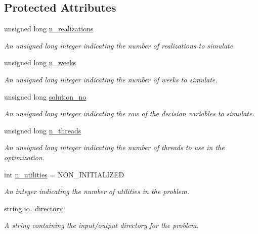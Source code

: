 \subsection*{Protected Attributes}
\begin{DoxyCompactItemize}
\item 
unsigned long \mbox{\hyperlink{classProblem_a270a5672643bfe09e52e0f24e1884136}{n\+\_\+realizations}}
\begin{DoxyCompactList}\small\item\em An unsigned long integer indicating the number of realizations to simulate. \end{DoxyCompactList}\item 
unsigned long \mbox{\hyperlink{classProblem_ac7513bb0ecdfa4bbb7d2ada3595d71ec}{n\+\_\+weeks}}
\begin{DoxyCompactList}\small\item\em An unsigned long integer indicating the number of weeks to simulate. \end{DoxyCompactList}\item 
unsigned long \mbox{\hyperlink{classProblem_a7ca15cdcbff926ddca25bdee5984ffe5}{solution\+\_\+no}}
\begin{DoxyCompactList}\small\item\em An unsigned long integer indicating the row of the decision variables to simulate. \end{DoxyCompactList}\item 
unsigned long \mbox{\hyperlink{classProblem_a3303a162d648e8ae16153b57b5b4054f}{n\+\_\+threads}}
\begin{DoxyCompactList}\small\item\em An unsigned long integer indicating the number of threads to use in the optimization. \end{DoxyCompactList}\item 
int \mbox{\hyperlink{classProblem_a4ca86ba2f568d232cf0421d39acff113}{n\+\_\+utilities}} = N\+O\+N\+\_\+\+I\+N\+I\+T\+I\+A\+L\+I\+Z\+ED
\begin{DoxyCompactList}\small\item\em An integer indicating the number of utilities in the problem. \end{DoxyCompactList}\item 
string \mbox{\hyperlink{classProblem_ac58848a0d808cf040c3fb3676b4a236f}{io\+\_\+directory}}
\begin{DoxyCompactList}\small\item\em A string containing the input/output directory for the problem. \end{DoxyCompactList}\item 

\end{DoxyCompactItemize}
